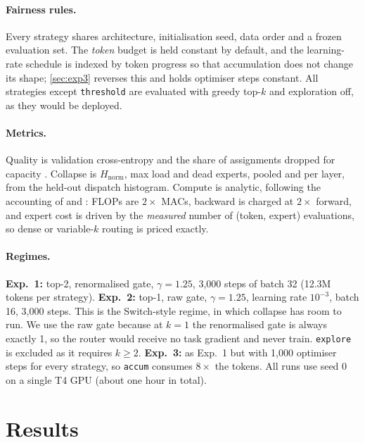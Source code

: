 \documentclass[10pt]{article}
\theoremstyle{definition}
\theoremstyle{remark}
\newcommand{\Hn}{H_{\mathrm{norm}}}
\newcommand{\code}[1]{\texttt{#1}}
\begin{document}
\paragraph{Fairness rules.}
Every strategy shares architecture, initialisation seed, data order and a frozen evaluation set. The \emph{token} budget is held constant by default, and the learning-rate schedule is indexed by token progress so that accumulation does not change its shape; \cref{sec:exp3} reverses this and holds optimiser steps constant. All strategies except \code{threshold} are evaluated with greedy top-$k$ and exploration off, as they would be deployed.

\paragraph{Metrics.}
Quality is validation cross-entropy and the share of assignments dropped for capacity \citep{fedus2022switch}. Collapse is $\Hn$, max load and dead experts, pooled and per layer, from the held-out dispatch histogram. Compute is analytic, following the accounting of \citet{kaplan2020scaling} and \citet{hoffmann2022training}: FLOPs are $2\times$ MACs, backward is charged at $2\times$ forward, and expert cost is driven by the \emph{measured} number of (token, expert) evaluations, so dense or variable-$k$ routing is priced exactly.

\paragraph{Regimes.}
\textbf{Exp.~1:} top-2, renormalised gate, $\gamma=1.25$, 3{,}000 steps of batch 32 (12.3M tokens per strategy). \textbf{Exp.~2:} top-1, raw gate, $\gamma=1.25$, learning rate $10^{-3}$, batch 16, 3{,}000 steps. This is the Switch-style regime, in which collapse has room to run. We use the raw gate because at $k=1$ the renormalised gate is always exactly 1, so the router would receive no task gradient and never train. \code{explore} is excluded as it requires $k\ge2$. \textbf{Exp.~3:} as Exp.~1 but with 1{,}000 optimiser steps for every strategy, so \code{accum} consumes $8\times$ the tokens. All runs use seed 0 on a single T4 GPU (about one hour in total).

\section{Results}
\label{sec:results}
\end{document}

